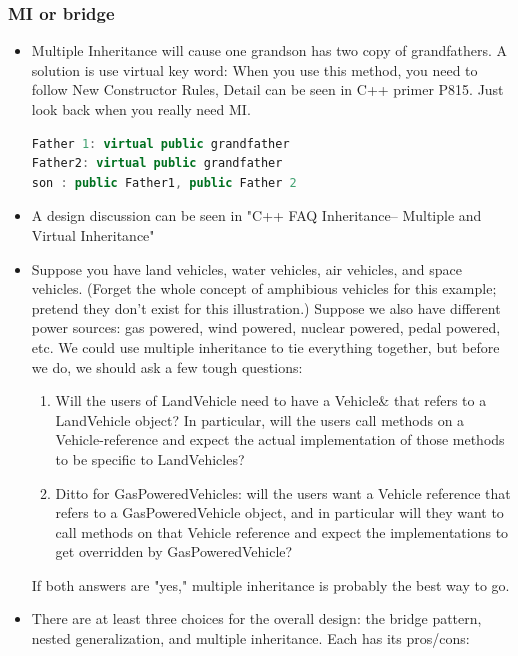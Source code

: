 \documentclass[a4paper,12pt,twoside]{book}
\begin{document}
\subsubsection{MI or bridge}
\begin{itemize}
\item Multiple Inheritance will cause one grandson has two copy of grandfathers. A solution is use virtual key word: When you use this method, you need to follow New Constructor Rules, Detail can be seen in C++ primer P815.  Just look back when you really need MI.
\begin{lstlisting}[frame=single, language=c++]
Father 1: virtual public grandfather
Father2: virtual public grandfather
son : public Father1, public Father 2
\end{lstlisting}

\item A design discussion can be seen in "C++ FAQ Inheritance-- Multiple and Virtual Inheritance"
\item Suppose you have land vehicles, water vehicles, air vehicles, and space vehicles. (Forget the whole concept of amphibious vehicles for this example; pretend they don't exist for this illustration.) Suppose we also have different power sources: gas powered, wind powered, nuclear powered, pedal powered, etc. We could use multiple inheritance to tie everything together, but before we do, we should ask a few tough questions:

\begin{enumerate}
\item Will the users of LandVehicle need to have a Vehicle\& that refers to a LandVehicle object? In particular, will the users call methods on a Vehicle-reference and expect the actual implementation of those methods to be specific to LandVehicles?

\item Ditto for GasPoweredVehicles: will the users want a Vehicle reference that refers to a GasPoweredVehicle object, and in particular will they want to call methods on that Vehicle reference and expect the implementations to get overridden by GasPoweredVehicle?
\end{enumerate}
If both answers are "yes," multiple inheritance is probably the best way to go.

\item There are at least three choices for the overall design: the bridge pattern, nested generalization, and multiple inheritance. Each has its pros/cons:


\end{itemize}
\end{document}
